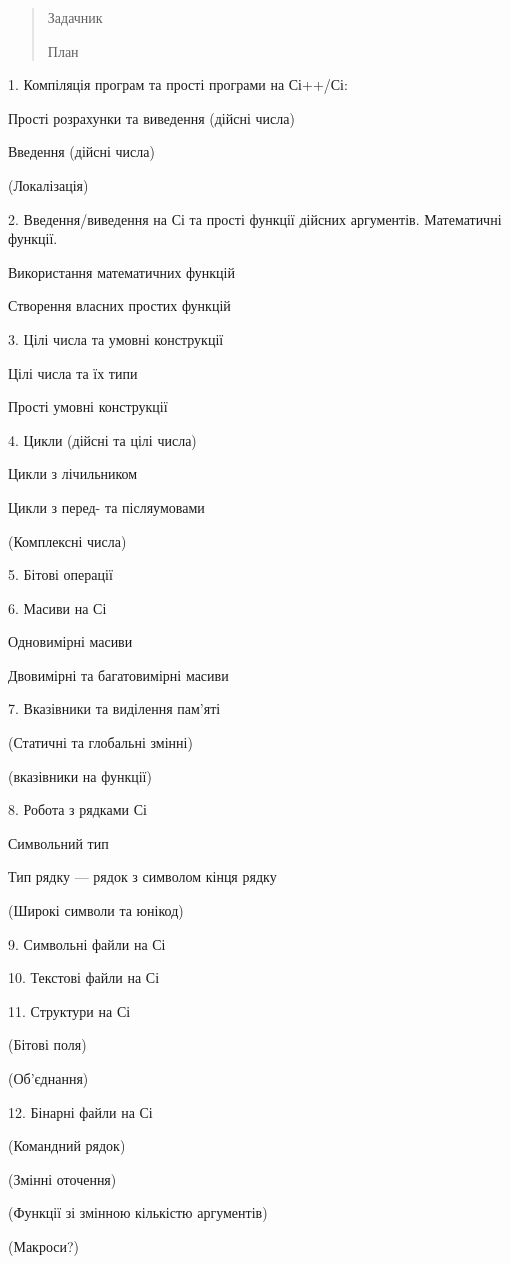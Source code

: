 \documentclass[]{article}
\date{}
\begin{document}
\begin{quote}
Задачник

План
\end{quote}

1. Компіляція програм та прості програми на Сі++/Сі:

Прості розрахунки та виведення (дійсні числа)

Введення (дійсні числа)

(Локалізація)

2. Введення/виведення на Сі та прості функції дійсних аргументів.
Математичні функції.

Використання математичних функцій

Створення власних простих функцій

3. Цілі числа та умовні конструкції

Цілі числа та їх типи

Прості умовні конструкції

4. Цикли (дійсні та цілі числа)

Цикли з лічильником

Цикли з перед- та післяумовами

(Комплексні числа)

5. Бітові операції

6. Масиви на Сі

Одновимірні масиви

Двовимірні та багатовимірні масиви

7. Вказівники та виділення пам'яті

(Статичні та глобальні змінні)

(вказівники на функції)

8. Робота з рядками Сі

Символьний тип

Тип рядку --- рядок з символом кінця рядку

(Широкі символи та юнікод)

9. Символьні файли на Сі

10. Текстові файли на Сі

11. Структури на Сі

(Бітові поля)

(Об'єднання)

12. Бінарні файли на Сі

(Командний рядок)

(Змінні оточення)

(Функції зі змінною кількістю аргументів)

(Макроси?)
\end{document}
